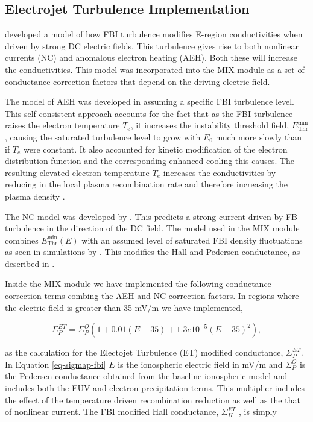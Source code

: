 \documentclass[draft,jgrga]{agutex}
\begin{document}
\begin{article}
\subsection{Electrojet Turbulence Implementation}
\label{sec-ET}

\cite{2011JGRA..116.9304D} developed a model of how FBI turbulence modifies E-region conductivities when driven by strong DC electric fields.  This turbulence gives rise to both nonlinear currents (NC) and anomalous electron heating (AEH). Both these will increase the conductivities. This model was incorporated into the MIX module as a set
of conductance correction factors that depend on the driving electric field.

The model of AEH was developed in \cite{2003JGRA..108.1350D} assuming a specific FBI turbulence level. This self-consistent approach accounts for the fact that as the FBI turbulence raises the electron temperature $T_e$, it increases the instability threshold field, $E_{\mathrm{Thr}}^{\min}$, causing the saturated turbulence level to grow with $E_0$ much more slowly than if $T_e$ were constant. It also accounted for kinetic modification of the electron distribution function and the corresponding enhanced cooling this causes.  The resulting elevated electron temperature $T_{e}$ increases the conductivities by reducing in the local plasma recombination rate and therefore increasing the plasma density \cite{1978SVPCS..10.....G,1990AdSpR..10..239S,2003JGRA..108.1350D,2006GeoRL..3313809M}.

The NC model was developed by \cite{1996GeoRL..23.3333O,1997AnGeo..15..899O}.  This predicts a strong current driven by FB turbulence in the direction of the DC field.  The model used in the MIX module combines $E_{\mathrm{Thr}}^{\min}(E)$ with an assumed level of saturated FBI density fluctuations as seen in simulations by \cite{2013JGRA..118.1306O}. This modifies the Hall and Pedersen conductance, as described in \cite{2011JGRA..116.9304D}.

Inside the MIX module we have implemented the following conductance correction terms combing the AEH and NC correction factors.   In regions where the electric field is greater than 35 mV/m we have implemented, 

\begin{equation}
\label{eq-sigmap-fbi}
\Sigma_P^{ET} = \Sigma_P^O(1+0.01 (E - 35) + 1.3e10^{-5}(E - 35)^2),
\end{equation}

as the calculation for the Electojet Turbulence (ET) modified conductance, $\Sigma_P^{ET}$.  In Equation \ref{eq-sigmap-fbi} $E$ is the ionospheric electric field in mV/m and $\Sigma_P^O$ is the Pedersen conductance obtained from the baseline ionospheric model and includes both the EUV and electron precipitation terms.  This multiplier includes the effect of the temperature driven recombination reduction as well as the that of nonlinear current.  The FBI modified Hall conductance, $\Sigma_H^{ET}$ ,  is simply 


\end{article}
\end{document}
